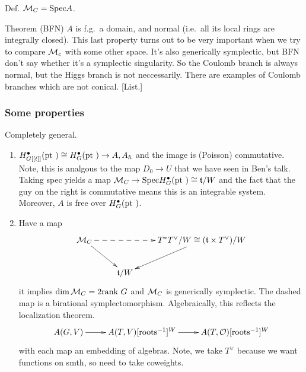 Def. $\mathcal{M}_C = {\rm Spec } A$. 

Theorem (BFN) $A$ is f.g.\, a domain, and normal (i.e.\ all its local rings are integrally closed). This last property turns out to be very important when we try to compare $\mathcal{M}_c$ with some other space. It's also generically symplectic, but BFN don't say whether it's a symplectic singularity. So the Coulomb branch is always normal, but the Higgs branch is not neccessarily. There are examples of Coulomb branches which are not conical. [List.]

\subsubsection{Some properties} 

Completely general. 

\begin{enumerate}
    \item $H^\bullet_{G[[t]]}({\rm pt ~})\cong H^\bullet_G({\rm pt ~}) \rightarrow A, A_{\hbar}$
    and the image is (Poisson) commutative. Note, this is analgous to the map $D_0\rightarrow U$ that we have seen in Ben's talk. Taking spec yields a map $\mathcal{M}_C\rightarrow {\rm Spec } H_G^\bullet({\rm pt ~}) \cong {\mathfrak{t}}/W$ and the fact that the guy on the right is commutative means this is an integrable system. Moreover, $A$ is free over $H_G^\bullet ({\rm pt ~})$. 
    \item Have a map \[\xymatrix{\M_C \ar@{-->}[rr]\ar[dr]& & T^\ast T^\vee /W\cong (\tt\times T^\vee)/W \ar[dl] \\ & \tt/W & }\] it implies $\dim \mathcal{M}_C = 2{\rm rank ~} G$ and $\mathcal{M}_C$ is generically symplectic. The dashed map is a birational symplectomorphism. Algebraically, this reflects the localization theorem. 
    \[\xymatrix{
        A(G,V) \ar[r] & A(T,V)[{\textrm{roots}}^{-1}]^W \ar[r] & A(T,\OO)[{\textrm{roots}}^{-1}]^W
    }\] with each map an embedding of algebras. Note, we take $T^\vee$ because we want functions on smth, so need to take coweights. 
\end{enumerate}

